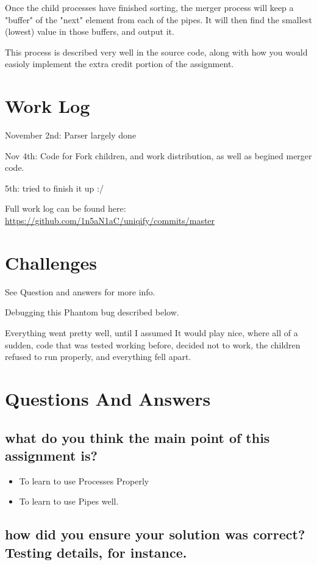 \documentclass[letterpaper,10pt,titlepage]{article}
\begin{document}
Once the child processes have finished sorting, the merger process will keep a "buffer" of the "next" element from each of the pipes.  It will then find the smallest (lowest) value in those buffers, and output it.

This process is described very well in the source code, along with how you would easioly implement the extra credit portion of the assignment.

\section{Work Log}

November 2nd: Parser largely done

Nov 4th: Code for Fork children, and work distribution, as well as begined merger code.

5th: tried to finish it up :/

Full work log can be found here:
\url{https://github.com/1n5aN1aC/uniqify/commits/master}

\section{Challenges}

See Question and answers for more info.

Debugging this Phantom bug described below.

Everything went pretty well, until I assumed It would play nice, where all of a sudden, code that was tested working before, decided not to work, the children refused to run properly, and everything fell apart.

\section{Questions And Answers}

\subsection{what do you think the main point of this assignment is?}

\begin{itemize}
\item To learn to use Processes Properly
\item To learn to use Pipes well.
\end{itemize}

\subsection{how did you ensure your solution was correct? Testing details, for instance.}
\end{document}
